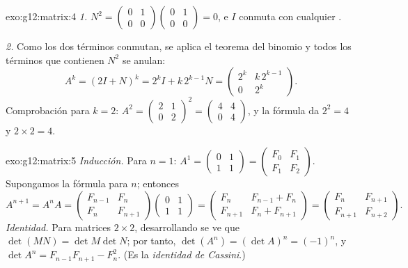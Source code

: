\begin{solution}{exo:g12:matrix:4}
\emph{1.} $N^2 = \begin{pmatrix} 0&1\\0&0\end{pmatrix}
\begin{pmatrix} 0&1\\0&0\end{pmatrix} = 0$, e $I$ conmuta con cualquier
.

\emph{2.} Como los dos términos conmutan, se aplica el teorema del binomio
y todos los términos que contienen $N^2$ se anulan:
\[
A^k = (2I + N)^k = 2^k I + k\,2^{k-1} N
= \begin{pmatrix} 2^k & k\,2^{k-1}\\ 0 & 2^k \end{pmatrix}.
\]
Comprobación para $k = 2$:
$A^2 = \begin{pmatrix} 2&1\\0&2\end{pmatrix}^2
= \begin{pmatrix} 4&4\\0&4\end{pmatrix}$, y la fórmula da $2^2 = 4$ y
$2 \times 2 = 4$. \checkmark
\end{solution}

\begin{solution}{exo:g12:matrix:5}
\emph{Inducción.} Para $n = 1$:
$A^1 = \begin{pmatrix} 0&1\\1&1\end{pmatrix}
= \begin{pmatrix} F_0 & F_1\\ F_1 & F_2\end{pmatrix}$. Supongamos la
fórmula para $n$; entonces
\[
A^{n+1} = A^n A
= \begin{pmatrix} F_{n-1} & F_n\\ F_n & F_{n+1}\end{pmatrix}
\begin{pmatrix} 0 & 1\\ 1 & 1\end{pmatrix}
= \begin{pmatrix} F_n & F_{n-1} + F_n\\ F_{n+1} & F_n + F_{n+1}\end{pmatrix}
= \begin{pmatrix} F_n & F_{n+1}\\ F_{n+1} & F_{n+2}\end{pmatrix}.
\]
\emph{Identidad.} Para matrices $2\times2$, desarrollando se ve que
$\det(MN) = \det M \det N$; por tanto,
$\det(A^n) = (\det A)^n = (-1)^n$, y
$\det A^n = F_{n-1}F_{n+1} - F_n^2$. (Es la \emph{identidad de Cassini}.)
\end{solution}

